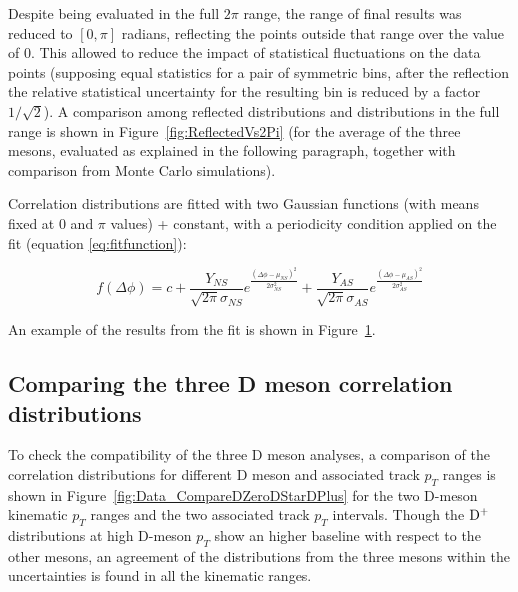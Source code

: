 Despite being evaluated in the full $2\pi$ range, the range of final results was reduced to $[0,\pi]$ radians, reflecting the points outside that range over the value of 0. This allowed to reduce the impact of statistical fluctuations on the data points (supposing equal statistics for a pair of symmetric bins, after the reflection the relative statistical uncertainty for the resulting bin is reduced by a factor $1/\sqrt{2}$).
A comparison among reflected distributions and distributions in the full range is shown in Figure~\ref{fig:ReflectedVs2Pi} (for the average of the three mesons, evaluated as explained in the following paragraph, together with comparison from Monte Carlo simulations).


Correlation distributions are fitted with two Gaussian functions (with means fixed at 0 and $\pi$ values) + constant, with a periodicity condition applied on the fit (equation \ref{eq:fitfunction}):

\begin{equation}
f\left(\Delta\phi\right) = c + \frac{Y_{NS}}{\sqrt{2\pi}\sigma_{NS}}e^{\frac{\left(\Delta\phi-\mu_{NS}\right)^{2}}{2\sigma_{NS}^{2}}} + \frac{Y_{AS}}{\sqrt{2\pi}\sigma_{AS}}e^{\frac{\left(\Delta\phi-\mu_{AS}\right)^{2}}{2\sigma_{AS}^{2}}}
\label{eq:fitfunction}
\end{equation}

An example of the results from the fit is shown in Figure~\ref{fig:ExFit}.

\begin{figure}[h]
\centering
 \label{fig:ExFit}
 \end{figure}

\subsection{Comparing the three D meson correlation distributions}
To check the compatibility of the three D meson analyses, a comparison of the correlation distributions for different D meson and associated track $p_{T}$ ranges is shown in Figure~\ref{fig:Data_CompareDZeroDStarDPlus} for the two D-meson kinematic $p_{T}$ ranges and the two associated track $p_{T}$ intervals. Though the ${\rm D^+}$ distributions at high D-meson $p_{T}$ show an higher baseline with respect to the other mesons, an agreement of the distributions from the three mesons within the uncertainties is found in all the kinematic ranges.

